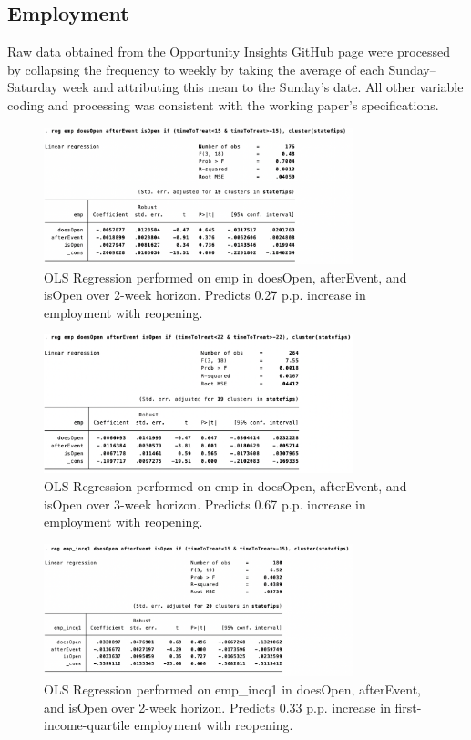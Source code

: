 \documentclass[12pt,letterpaper]{article}
\begin{document}
      \subsection{Employment}
Raw data obtained from the Opportunity Insights GitHub page were processed by collapsing the frequency to weekly by taking the average of each Sunday–Saturday week and attributing this mean to the Sunday’s date.  All other variable coding and processing was consistent with the working paper’s specifications.
        \begin{figure}[!ht]
          \centering
          \includegraphics[width=0.8\textwidth]{figures/emp_2wk.png}
\caption{OLS Regression performed on emp in doesOpen, afterEvent, and isOpen over 2-week horizon.  Predicts 0.27 p.p. increase in employment with reopening.}
          \label{fig:figures-emp_2wk-png}
        \end{figure}
        \begin{figure}[!ht]
          \centering
          \includegraphics[width=0.8\textwidth]{figures/emp_3wk.png}
\caption{OLS Regression performed on emp in doesOpen, afterEvent, and isOpen over 3-week horizon.  Predicts 0.67 p.p. increase in employment with reopening.}
          \label{fig:figures-emp_3wk-png}
        \end{figure}
        \begin{figure}[!ht]
          \centering
          \includegraphics[width=0.8\textwidth]{figures/emp_incq1.png}
\caption{OLS Regression performed on emp\_incq1 in doesOpen, afterEvent, and isOpen over 2-week horizon.  Predicts 0.33 p.p. increase in first-income-quartile employment with reopening.}
          \label{fig:figures-emp_incq1-png}
        \end{figure}
\end{document}
